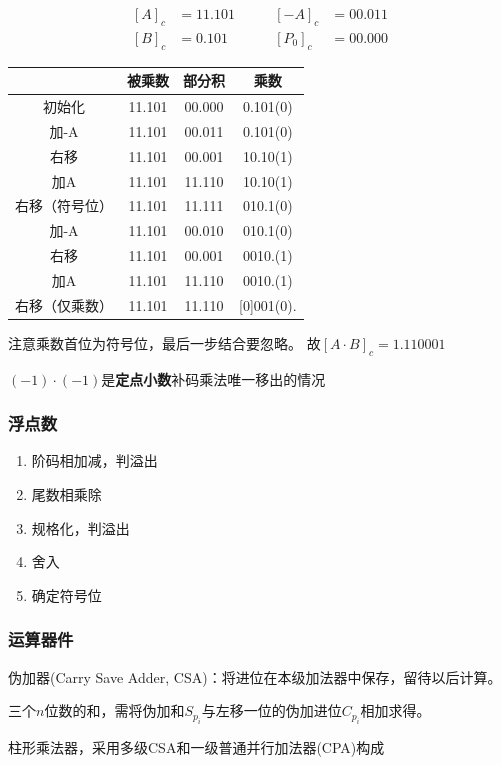 \begin{analysis}
\[\begin{aligned}
[A]_c&=11.101 \qquad &[-A]_c&=00.011\\
[B]_c&=0.101 \qquad &[P_0]_c&=00.000
\end{aligned}\]
\begin{center}
\begin{tabular}{|c|c|c|c|}\hline
& 被乘数 & 部分积 & 乘数\\\hline
初始化 & 11.101 & 00.000 & 0.101(0)\\\hline
加-A & 11.101 & 00.011 & 0.101(0)\\\hline
右移 & 11.101 & 00.001 & 10.10(1)\\\hline
加A & 11.101 & 11.110 & 10.10(1)\\\hline
右移（符号位）& 11.101 & 11.111 & 010.1(0)\\\hline
加-A & 11.101 & 00.010 & 010.1(0)\\\hline
右移 & 11.101 & 00.001 & 0010.(1)\\\hline
加A & 11.101 & 11.110 & 0010.(1)\\\hline
右移（仅乘数） & 11.101 & 11.110 & [0]001(0).\\\hline
\end{tabular}
\end{center}
\par 注意乘数首位为符号位，最后一步结合要忽略。
故$[A\cdot B]_c=1.110001$
\end{analysis}
\par * $(-1)\cdot(-1)$是\textbf{定点小数}补码乘法唯一移出的情况\\

\subsubsection{浮点数}
\begin{enumerate}
	\item 阶码相加减，判溢出
	\item 尾数相乘除
	\item 规格化，判溢出
	\item 舍入
	\item 确定符号位
\end{enumerate}

\subsubsection{运算器件}
伪加器(Carry Save Adder, CSA)：将进位在本级加法器中保存，留待以后计算。
\par 三个$n$位数的和，需将伪加和$S_{p_i}$与左移一位的伪加进位$C_{p_i}$相加求得。
\par 柱形乘法器，采用多级CSA和一级普通并行加法器(CPA)构成

